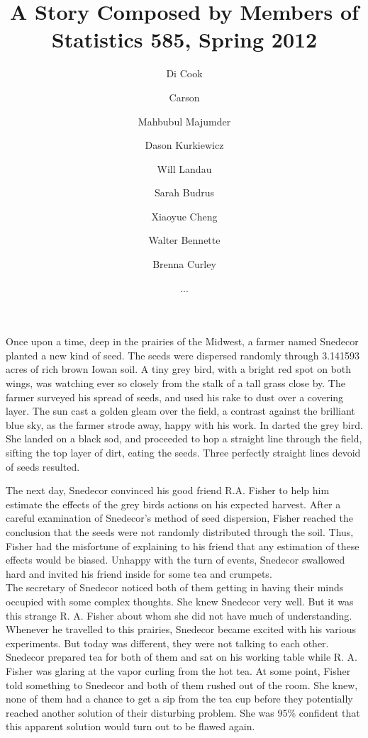 \documentclass{article}
\begin{document}
\title{A Story Composed by Members of Statistics 585, Spring 2012}
\author{Di Cook \and Carson \and Mahbubul Majumder \and Dason Kurkiewicz \and Will Landau \and Sarah Budrus \and Xiaoyue Cheng \and Walter Bennette \and Brenna Curley \and ...}
\maketitle

Once upon a time, deep in the prairies of the Midwest, a farmer named Snedecor planted a new kind of seed. The seeds were dispersed randomly through 3.141593 acres of rich brown Iowan soil. A tiny grey bird, with a bright red spot on both wings, was watching ever so closely from the stalk of a tall grass close by. The farmer surveyed his spread of seeds, and used his rake to dust over a covering layer. The sun cast a golden gleam over the field, a contrast against the brilliant blue sky, as the farmer strode away, happy with his work. In darted the grey bird. She landed on a black sod, and proceeded to hop a straight line through the field, sifting the top layer of dirt, eating the seeds. Three perfectly straight lines devoid of seeds resulted. 

The next day, Snedecor convinced his good friend R.A. Fisher to help him estimate the effects of the grey birds actions on his expected harvest. After a careful examination of Snedecor's method of seed dispersion, Fisher reached the conclusion that the seeds were not randomly distributed through the soil. Thus, Fisher had the misfortune of explaining to his friend that any estimation of these effects would be biased. Unhappy with the turn of events, Snedecor swallowed hard and invited his friend inside for some tea and crumpets. \\


The secretary of Snedecor noticed both of them getting in having their minds occupied with some complex thoughts. She knew Snedecor very well. But it was this strange R. A. Fisher about whom she did not have much of understanding. Whenever he travelled to this prairies, Snedecor became excited with his various experiments. But today was different, they were not talking to each other. Snedecor prepared tea for both of them and sat on his working table while R. A. Fisher was glaring at the vapor curling from the hot tea. At some point, Fisher told something to Snedecor and both of them rushed out of the room. She knew, none of them had a chance to get a sip from the tea cup before they potentially reached another solution of their disturbing problem. She was 95\% confident that this apparent solution would turn out to be flawed again. 
\end{document}
